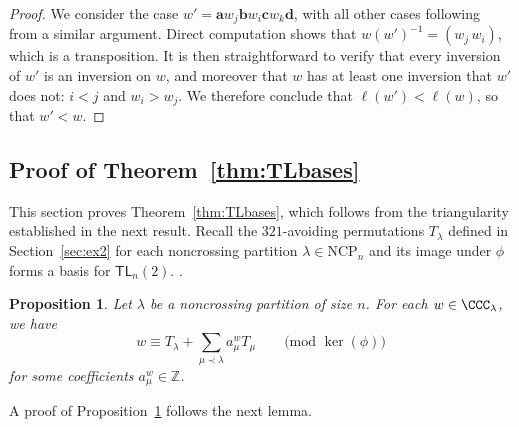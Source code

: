 \documentclass[12pt]{amsart}
\newtheorem{prop}[equation]{Proposition}
\theoremstyle{definition}
\theoremstyle{remark}
\numberwithin{equation}{section}
\newcommand{\ZZ}{\mathbb{Z}}
\newcommand{\TL}{\mathsf{TL}}
\newcommand{\NCP}{\mathrm{NCP}}
\begin{document}
\begin{proof}
We consider the case $w'=\mathbf{a}w_{j}\mathbf{b}w_{i}\mathbf{c}w_{k}\mathbf{d}$, with all other cases following from a similar argument.  
Direct computation shows that $w(w')^{-1}= (w_j\,w_i)$, which is a transposition. 
It is then straightforward to verify that every inversion of $w'$ is an inversion on $w$, and moreover that $w$ has at least one inversion that $w'$ does not: $i < j$ and $w_{i} > w_{j}$.  We therefore conclude that $\ell(w')<\ell(w)$, so that $w' < w$.  
\end{proof}


\subsection{Proof of Theorem~\ref{thm:TLbases}}
\label{sec:basistheoremproof}

This section proves Theorem~\ref{thm:TLbases}, which follows from the triangularity established in the next result.  Recall the $321$-avoiding permutations $T_{\lambda}$ defined in Section~\ref{sec:ex2} for each noncrossing partition $\lambda \in \NCP_{n}$ and its image under $\phi$ forms a basis for $\TL_{n}(2)$. .

\begin{prop}
\label{prop:TLbases}
Let $\lambda$ be a noncrossing partition of size $n$.  For each $w \in \CCC_{\lambda}$, we have
\[
w \equiv T_{\lambda} + \sum_{\mu \prec \lambda} a_{\mu}^{w} T_{\mu} \qquad \text{(mod $\ker(\phi)$)}
\]
for some coefficients $a_{\mu}^{w} \in \ZZ$.
\end{prop}

A proof of Proposition~\ref{prop:TLbases} follows the next lemma.
\end{document}
